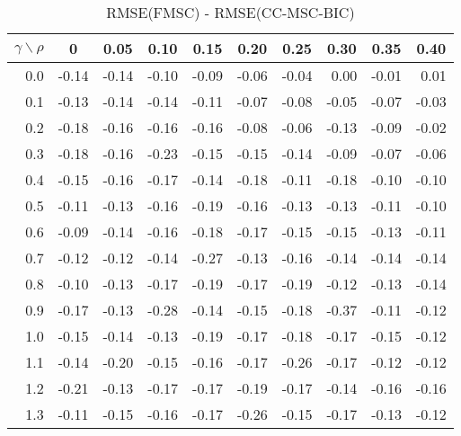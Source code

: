 \documentclass[12pt]{article}
\begin{document}
\begin{table}[!tbp]
\caption{RMSE(FMSC) - RMSE(CC-MSC-BIC)}
 \begin{center}
 \begin{tabular}{r|rrrrrrrrr}\hline\hline
\multicolumn{1}{c|}{$\gamma\backslash\rho$}&\multicolumn{1}{c}{0}&\multicolumn{1}{c}{0.05}&\multicolumn{1}{c}{0.10}&\multicolumn{1}{c}{0.15}&\multicolumn{1}{c}{0.20}&\multicolumn{1}{c}{0.25}&\multicolumn{1}{c}{0.30}&\multicolumn{1}{c}{0.35}&\multicolumn{1}{c}{0.40}\tabularnewline
\hline

0.0&-0.14&-0.14&-0.10&-0.09&-0.06&-0.04& 0.00&-0.01& 0.01\tabularnewline
0.1&-0.13&-0.14&-0.14&-0.11&-0.07&-0.08&-0.05&-0.07&-0.03\tabularnewline
0.2&-0.18&-0.16&-0.16&-0.16&-0.08&-0.06&-0.13&-0.09&-0.02\tabularnewline
0.3&-0.18&-0.16&-0.23&-0.15&-0.15&-0.14&-0.09&-0.07&-0.06\tabularnewline
0.4&-0.15&-0.16&-0.17&-0.14&-0.18&-0.11&-0.18&-0.10&-0.10\tabularnewline
0.5&-0.11&-0.13&-0.16&-0.19&-0.16&-0.13&-0.13&-0.11&-0.10\tabularnewline
0.6&-0.09&-0.14&-0.16&-0.18&-0.17&-0.15&-0.15&-0.13&-0.11\tabularnewline
0.7&-0.12&-0.12&-0.14&-0.27&-0.13&-0.16&-0.14&-0.14&-0.14\tabularnewline
0.8&-0.10&-0.13&-0.17&-0.19&-0.17&-0.19&-0.12&-0.13&-0.14\tabularnewline
0.9&-0.17&-0.13&-0.28&-0.14&-0.15&-0.18&-0.37&-0.11&-0.12\tabularnewline
1.0&-0.15&-0.14&-0.13&-0.19&-0.17&-0.18&-0.17&-0.15&-0.12\tabularnewline
1.1&-0.14&-0.20&-0.15&-0.16&-0.17&-0.26&-0.17&-0.12&-0.12\tabularnewline
1.2&-0.21&-0.13&-0.17&-0.17&-0.19&-0.17&-0.14&-0.16&-0.16\tabularnewline
1.3&-0.11&-0.15&-0.16&-0.17&-0.26&-0.15&-0.17&-0.13&-0.12\tabularnewline
\hline
\end{tabular}

\end{center}

\end{table}

%
\end{document}
